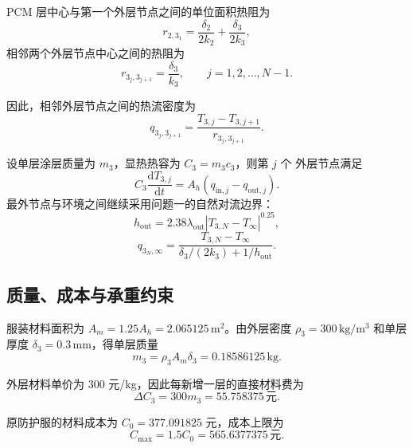 \documentclass[withoutpreface,bwprint]{cumcmthesis}
\begin{document}
PCM 层中心与第一个外层节点之间的单位面积热阻为
\begin{equation*}
    r_{2,3_1}=\frac{\delta_2}{2k_2}+\frac{\delta_3}{2k_3},
\end{equation*}
相邻两个外层节点中心之间的热阻为
\begin{equation*}
    r_{3_j,3_{j+1}}=\frac{\delta_3}{k_3},
    \qquad j=1,2,\ldots,N-1.
\end{equation*}

因此，相邻外层节点之间的热流密度为
\begin{equation*}
    q_{3_j,3_{j+1}}
    =\frac{T_{3,j}-T_{3,j+1}}{r_{3_j,3_{j+1}}}.
\end{equation*}

设单层涂层质量为 $m_3$，显热热容为 $C_3=m_3c_3$，则第 $j$ 个
外层节点满足
\begin{equation}
    C_3\frac{\mathrm dT_{3,j}}{\mathrm dt}
    =A_h\left(q_{\mathrm{in},j}-q_{\mathrm{out},j}\right).
    \label{eq:q3-outer-balance}
\end{equation}
最外节点与环境之间继续采用问题一的自然对流边界：
\begin{equation*}
    h_{\mathrm{out}}
    =2.38\lambda_{\mathrm{out}}
    \left|T_{3,N}-T_{\infty}\right|^{0.25},
\end{equation*}
\begin{equation*}
    q_{3_N,\infty}
    =\frac{T_{3,N}-T_{\infty}}
    {\delta_3/(2k_3)+1/h_{\mathrm{out}}}.
\end{equation*}
\subsection{质量、成本与承重约束}

服装材料面积为 $A_m=1.25A_h=2.065125\,\mathrm{m^2}$。由外层密度
$\rho_3=300\,\mathrm{kg/m^3}$ 和单层厚度 $\delta_3=0.3\,\mathrm{mm}$，得单层质量
\begin{equation*}
    m_3=\rho_3A_m\delta_3=0.18586125\,\mathrm{kg}.
\end{equation*}

外层材料单价为 $300$ 元/kg，因此每新增一层的直接材料费为
\begin{equation*}
    \Delta C_3=300m_3=55.758375\,\text{元}.
\end{equation*}

原防护服的材料成本为 $C_0=377.091825$ 元，成本上限为
\begin{equation*}
    C_{\max}=1.5C_0=565.6377375\,\text{元}.
\end{equation*}
\end{document}
